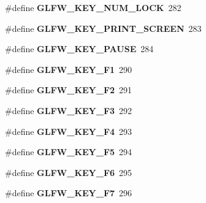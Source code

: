 \begin{DoxyCompactItemize}
\item 
\hypertarget{group__keys_ga3946edc362aeff213b2be6304296cf43}{}\#define {\bfseries G\+L\+F\+W\+\_\+\+K\+E\+Y\+\_\+\+N\+U\+M\+\_\+\+L\+O\+C\+K}~282\label{group__keys_ga3946edc362aeff213b2be6304296cf43}

\item 
\hypertarget{group__keys_gaf964c2e65e97d0cf785a5636ee8df642}{}\#define {\bfseries G\+L\+F\+W\+\_\+\+K\+E\+Y\+\_\+\+P\+R\+I\+N\+T\+\_\+\+S\+C\+R\+E\+E\+N}~283\label{group__keys_gaf964c2e65e97d0cf785a5636ee8df642}

\item 
\hypertarget{group__keys_ga8116b9692d87382afb5849b6d8907f18}{}\#define {\bfseries G\+L\+F\+W\+\_\+\+K\+E\+Y\+\_\+\+P\+A\+U\+S\+E}~284\label{group__keys_ga8116b9692d87382afb5849b6d8907f18}

\item 
\hypertarget{group__keys_gafb8d66c573acf22e364049477dcbea30}{}\#define {\bfseries G\+L\+F\+W\+\_\+\+K\+E\+Y\+\_\+\+F1}~290\label{group__keys_gafb8d66c573acf22e364049477dcbea30}

\item 
\hypertarget{group__keys_ga0900750aff94889b940f5e428c07daee}{}\#define {\bfseries G\+L\+F\+W\+\_\+\+K\+E\+Y\+\_\+\+F2}~291\label{group__keys_ga0900750aff94889b940f5e428c07daee}

\item 
\hypertarget{group__keys_gaed7cd729c0147a551bb8b7bb36c17015}{}\#define {\bfseries G\+L\+F\+W\+\_\+\+K\+E\+Y\+\_\+\+F3}~292\label{group__keys_gaed7cd729c0147a551bb8b7bb36c17015}

\item 
\hypertarget{group__keys_ga9b61ebd0c63b44b7332fda2c9763eaa6}{}\#define {\bfseries G\+L\+F\+W\+\_\+\+K\+E\+Y\+\_\+\+F4}~293\label{group__keys_ga9b61ebd0c63b44b7332fda2c9763eaa6}

\item 
\hypertarget{group__keys_gaf258dda9947daa428377938ed577c8c2}{}\#define {\bfseries G\+L\+F\+W\+\_\+\+K\+E\+Y\+\_\+\+F5}~294\label{group__keys_gaf258dda9947daa428377938ed577c8c2}

\item 
\hypertarget{group__keys_ga6dc2d3f87b9d51ffbbbe2ef0299d8e1d}{}\#define {\bfseries G\+L\+F\+W\+\_\+\+K\+E\+Y\+\_\+\+F6}~295\label{group__keys_ga6dc2d3f87b9d51ffbbbe2ef0299d8e1d}

\item 
\hypertarget{group__keys_gacca6ef8a2162c52a0ac1d881e8d9c38a}{}\#define {\bfseries G\+L\+F\+W\+\_\+\+K\+E\+Y\+\_\+\+F7}~296\label{group__keys_gacca6ef8a2162c52a0ac1d881e8d9c38a}


\end{DoxyCompactItemize}
